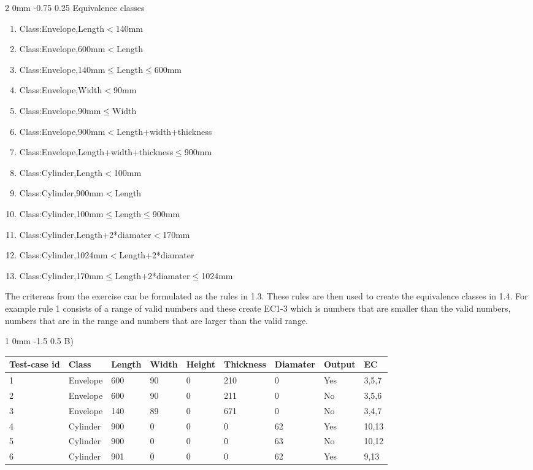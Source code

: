 \documentclass[a4paper,11pt]{article}
\makeatletter
\renewcommand{\section}{\@startsection
   {section}%
   {1}%
   {0mm}%
   {-1.5\baselineskip}%
   {0.5\baselineskip}%
   {\sffamily\bfseries\upshape\normalsize}}%
\renewcommand{\subsection}{\@startsection
   {subsection}%
   {2}%
   {0mm}%
   {-0.75\baselineskip}%
   {0.25\baselineskip}%
   {\rmfamily\normalfont\slshape\normalsize}}%
\makeatother
\begin{document}
\subsection{Equivalence classes}
\begin{enumerate}
\item Class:Envelope,Length$<$140mm
\item Class:Envelope,600mm$<$Length
\item Class:Envelope,140mm$\leq$Length$\leq$600mm
\item Class:Envelope,Width$<$90mm
\item Class:Envelope,90mm$\leq$Width
\item Class:Envelope,900mm$<$Length+width+thickness
\item Class:Envelope,Length+width+thickness$\leq$900mm
\item Class:Cylinder,Length$<$100mm
\item Class:Cylinder,900mm$<$Length
\item Class:Cylinder,100mm$\leq$Length$\leq$900mm
\item Class:Cylinder,Length+2*diamater$<$170mm
\item Class:Cylinder,1024mm$<$Length+2*diamater
\item Class:Cylinder,170mm$\leq$Length+2*diamater$\leq$1024mm
\end{enumerate}
The critereas from the exercise can be formulated as the rules in 1.3. These rules are then used to create the equivalence classes in 1.4. For example rule 1 consists of a range of valid numbers and these create EC1-3 which is numbers that are smaller than the valid numbers, numbers that are in the range and numbers that are larger than the valid range.
\section{B)}
\begin{center}
    \begin{tabular}{| l | l | l | l | l | l | l | l | l |}
    \hline
    Test-case id & Class & Length & Width & Height & Thickness & Diamater & Output & EC \\ \hline
    1 & Envelope & 600 & 90 & 0 & 210 & 0 & Yes & 3,5,7 \\ \hline
    2 & Envelope & 600 & 90 & 0 & 211 & 0 & No &3,5,6 \\ \hline
	3 & Envelope & 140 & 89 & 0 & 671 & 0 & No & 3,4,7 \\ \hline
	4 & Cylinder & 900 & 0 & 0 & 0 & 62 & Yes & 10,13 \\ \hline
	5 & Cylinder & 900 & 0 & 0 & 0 & 63 & No & 10,12 \\ \hline
	6 & Cylinder & 901 & 0 & 0 & 0 & 62 & Yes & 9,13 \\ \hline
    \end{tabular}
\end{center} 
\end{document}
